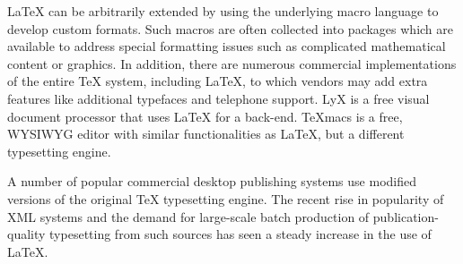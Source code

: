 \documentclass[12pt]{ucthesis}
\begin{document}
LaTeX can be arbitrarily extended by using the underlying macro language to develop custom formats. Such macros are often collected into packages which are available to address special formatting issues such as complicated mathematical content or graphics. In addition, there are numerous commercial implementations of the entire TeX system, including LaTeX, to which vendors may add extra features like additional typefaces and telephone support. LyX is a free visual document processor that uses LaTeX for a back-end. TeXmacs is a free, WYSIWYG editor with similar functionalities as LaTeX, but a different typesetting engine.

A number of popular commercial desktop publishing systems use modified versions of the original TeX typesetting engine. The recent rise in popularity of XML systems and the demand for large-scale batch production of publication-quality typesetting from such sources has seen a steady increase in the use of LaTeX.



\clearpage


\end{document}
